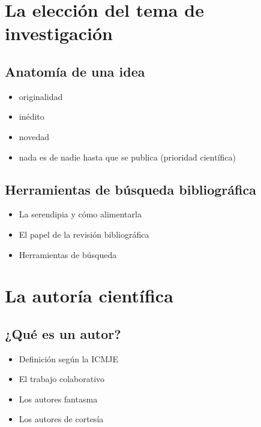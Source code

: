 \documentclass[
]{book}
\providecommand{\tightlist}{%
  \setlength{\itemsep}{0pt}\setlength{\parskip}{0pt}}
\begin{document}
\hypertarget{la-elecciuxf3n-del-tema-de-investigaciuxf3n}{%
\chapter{La elección del tema de investigación}\label{la-elecciuxf3n-del-tema-de-investigaciuxf3n}}

\hypertarget{anatomuxeda-de-una-idea}{%
\section{Anatomía de una idea}\label{anatomuxeda-de-una-idea}}

\begin{itemize}
\tightlist
\item
  originalidad
\item
  inédito
\item
  novedad
\item
  nada es de nadie hasta que se publica (prioridad científica)
\end{itemize}

\hypertarget{herramientas-de-buxfasqueda-bibliogruxe1fica}{%
\section{Herramientas de búsqueda bibliográfica}\label{herramientas-de-buxfasqueda-bibliogruxe1fica}}

\begin{itemize}
\tightlist
\item
  La serendipia y cómo alimentarla
\item
  El papel de la revisión bibliográfica
\item
  Herramientas de búsqueda
\end{itemize}

\hypertarget{la-autoruxeda-cientuxedfica}{%
\chapter{La autoría científica}\label{la-autoruxeda-cientuxedfica}}

\hypertarget{quuxe9-es-un-autor}{%
\section{¿Qué es un autor?}\label{quuxe9-es-un-autor}}

\begin{itemize}
\tightlist
\item
  Definición según la ICMJE
\item
  El trabajo colaborativo
\item
  Los autores fantasma
\item
  Los autores de cortesía
\end{itemize}
\end{document}
